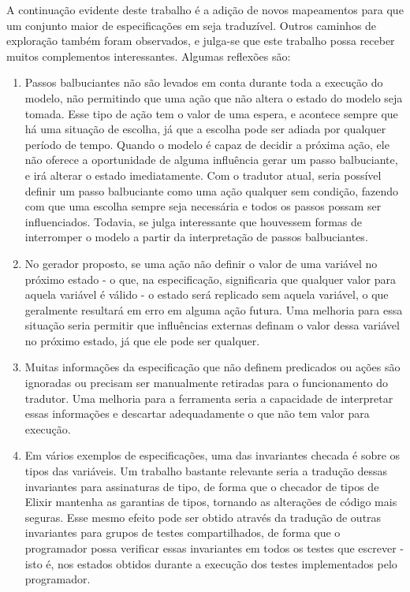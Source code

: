 A continuação evidente deste trabalho é a adição de novos mapeamentos para que
um conjunto maior de especificações em \TLA seja traduzível. Outros caminhos de
exploração também foram observados, e julga-se que este trabalho possa receber
muitos complementos interessantes. Algumas reflexões são:
\begin{enumerate}
  \item Passos balbuciantes não são levados em conta durante toda a execução do
    modelo, não permitindo que uma ação que não altera o estado do modelo seja
    tomada. Esse tipo de ação tem o valor de uma espera, e acontece sempre que
    há uma situação de escolha, já que a escolha pode ser adiada por qualquer
    período de tempo. Quando o modelo é capaz de decidir a próxima ação, ele não
    oferece a oportunidade de alguma influência gerar um passo balbuciante, e
    irá alterar o estado imediatamente. Com o tradutor atual, seria possível
    definir um passo balbuciante como uma ação qualquer sem condição, fazendo
    com que uma escolha sempre seja necessária e
    todos os passos possam ser influenciados. Todavia, se julga interessante que
    houvessem formas de interromper o modelo a partir da interpretação de passos
    balbuciantes.

  \item No gerador proposto, se uma ação não definir o valor de uma variável no
    próximo estado - o que, na especificação, significaria que qualquer valor
    para aquela variável é válido - o estado será replicado sem aquela variável,
    o que geralmente resultará em erro em alguma ação futura. Uma melhoria para
    essa situação seria permitir que influências externas definam o valor dessa
    variável no próximo estado, já que ele pode ser qualquer.

  \item Muitas informações da especificação que não definem predicados ou ações
    são ignoradas ou precisam ser manualmente retiradas para o funcionamento do
    tradutor. Uma melhoria para a ferramenta seria a capacidade de interpretar
    essas informações e descartar adequadamente o que não tem valor para
    execução.

  \item Em vários exemplos de especificações, uma das invariantes checada é
    sobre os tipos das variáveis. Um trabalho bastante relevante seria a
    tradução dessas invariantes para assinaturas de tipo, de forma que o
    checador de tipos de Elixir mantenha as garantias de tipos, tornando as
    alterações de código mais seguras. Esse mesmo efeito pode ser obtido
    através da tradução de outras invariantes para grupos de testes
    compartilhados, de forma que o programador possa verificar essas invariantes
    em todos os testes que escrever - isto é, nos estados obtidos durante a
    execução dos testes implementados pelo programador.


\end{enumerate}
